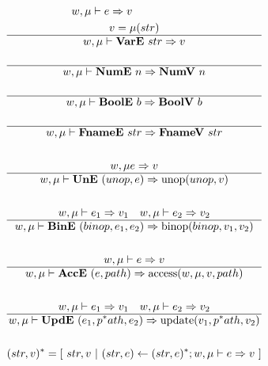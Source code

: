 





\begin{gather*}
  w, \mu \vdash e \Rightarrow v
%
\newline \\
  v = \mu(str) \\
  \hline
  w, \mu \vdash \vare ~ str \Rightarrow v \\
%
\newline \\
  \hline
  w, \mu \vdash \nume ~ n \Rightarrow \numv ~ n \\
%
\newline \\
  \hline
  w, \mu \vdash \boole ~ b \Rightarrow \boolv ~ b \\
%
\newline \\
  \hline
  w, \mu \vdash \fnamee ~ str \Rightarrow \fnamev ~ str \\
%
\newline \\
  w, \mu e \Rightarrow v \\
  \hline
  w, \mu \vdash \une ~ (unop, e) \Rightarrow \unop(unop, v) \\
%
\newline \\
  w, \mu \vdash e_1 \Rightarrow v_1 \quad w, \mu \vdash e_2 \Rightarrow v_2 \\
  \hline
  w, \mu \vdash \bine ~ (binop, e_1, e_2) \Rightarrow \binop(binop, v_1, v_2) \\
%
\newline \\
  w, \mu \vdash e \Rightarrow v \\
  \hline
  w, \mu \vdash \acce ~ (e, path) \Rightarrow \access(w, \mu, v, path) \\
%
\newline \\
  w, \mu \vdash e_1 \Rightarrow v_1 \quad w, \mu \vdash e_2 \Rightarrow v_2 \\
  \hline
  w, \mu \vdash \upde ~ (e_1, \seq path, e_2) \Rightarrow \update(v_1, \seq path, v_2) \\
%
\newline \\
  \seq{(str, v)} =
    [ ~
      str, v
    ~ | ~
      (str, e) \leftarrow \seq{(str, e)}; w, \mu \vdash e \Rightarrow v
    ~ ] \\

\end{gather*}

